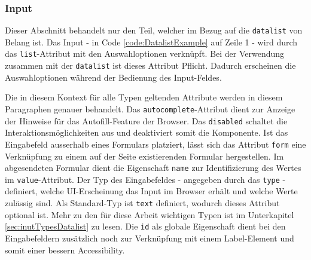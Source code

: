 \subsubsection{\color{dgray} Input}
\label{sec:input}

Dieser Abschnitt behandelt nur den Teil, welcher im Bezug auf die \texttt{datalist} von Belang ist.
Das Input - in Code \ref{code:DatalistExample} auf Zeile 1 - wird durch das \texttt{list}-Attribut mit den Auswahloptionen verknüpft.
Bei der Verwendung zusammen mit der \texttt{datalist} ist dieses Attribut Pflicht.
Dadurch erscheinen die Auswahloptionen während der Bedienung des Input-Feldes. 

Die in diesem Kontext für alle Typen geltenden Attribute werden in diesem Paragraphen genauer behandelt.
Das \texttt{autocomplete}-Attribut dient zur Anzeige der Hinweise für das Autofill-Feature der Browser.
Das \texttt{disabled} schaltet die Interaktionsmöglichkeiten aus und deaktiviert somit die Komponente.
Ist das Eingabefeld ausserhalb eines Formulars platziert, lässt sich das Attribut \texttt{form} eine Verknüpfung zu einem auf der Seite existierenden Formular hergestellen. 
Im abgesendeten Formular dient die Eigenschaft \texttt{name} zur Identifizierung des Wertes im \texttt{value}-Attribut.
Der Typ des Eingabefeldes - angegeben durch das \texttt{type} - definiert, welche UI-Erscheinung das Input im Browser erhält und welche Werte zulässig sind.
Als Standard-Typ ist \texttt{text} definiert, wodurch dieses Attribut optional ist.
Mehr zu den für diese Arbeit wichtigen Typen ist im Unterkapitel \ref{sec:inutTypesDatalist} zu lesen.
Die \texttt{id} als globale Eigenschaft dient bei den Eingabefeldern zusätzlich noch zur Verknüpfung mit einem Label-Element und somit einer bessern Accessibility.

